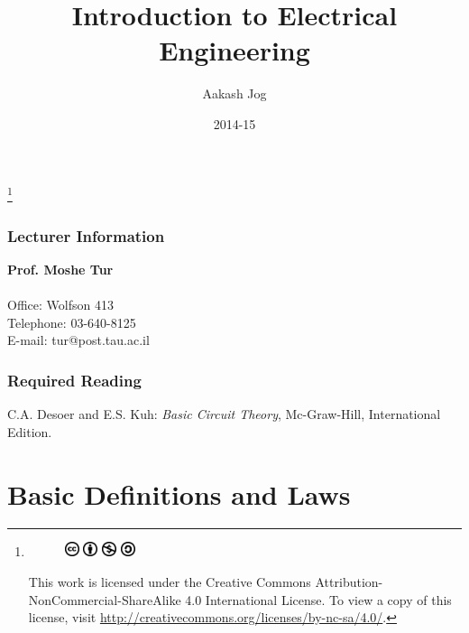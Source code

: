 \documentclass[fleqn, a4paper, 12pt, twoside]{article}
\title{Introduction to Electrical Engineering}
\author{Aakash Jog}
\date{2014-15}
\theoremstyle{definition}
\theoremstyle{theorem}
\newcommand\blfootnote[1]{%
	\begingroup
	\renewcommand\thefootnote{}\footnote{#1}%
	\addtocounter{footnote}{-1}%
	\endgroup
}
\begin{document}
\maketitle

\blfootnote
{	
	\begin{figure}[H]
		\includegraphics[height = 12pt]{cc.eps}
		\includegraphics[height = 12pt]{by.eps}
		\includegraphics[height = 12pt]{nc.eps}
		\includegraphics[height = 12pt]{sa.eps}
	\end{figure}
	This work is licensed under the Creative Commons Attribution-NonCommercial-ShareAlike 4.0 International License. To view a copy of this license, visit \url{http://creativecommons.org/licenses/by-nc-sa/4.0/}.
} %

\tableofcontents

 \newpage

\section{Lecturer Information}

\textbf{Prof. Moshe Tur}\\
~\\
Office: Wolfson 413\\
Telephone: 03-640-8125\\
E-mail: tur@post.tau.ac.il\\

\section{Required Reading}

C.A. Desoer and E.S. Kuh: \textit{Basic Circuit Theory}, Mc-Graw-Hill, International Edition.

\newpage
\part{Basic Definitions and Laws}
\end{document}
